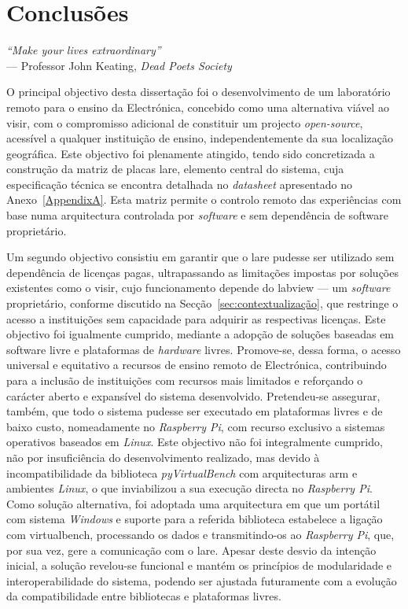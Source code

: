 \chapter{Conclusões}
\label{Capítulo6}
\begin{flushright}
\textit{``Make your lives extraordinary''} \\[0.5em]
--- Professor John Keating, \textit{Dead Poets Society}
\end{flushright}
O principal objectivo desta dissertação foi o desenvolvimento de um \acrshort{laboratório remoto} para o ensino da Electrónica, concebido como uma alternativa viável ao \acrshort{visir}, com o compromisso adicional de constituir um projecto \textit{open-source}, acessível a qualquer instituição de ensino, independentemente da sua localização geográfica. Este objectivo foi plenamente atingido, tendo sido concretizada a construção da matriz de placas \acrshort{lare}, elemento central do sistema, cuja especificação técnica se encontra detalhada no \textit{datasheet} apresentado no Anexo~\ref{AppendixA}. Esta matriz permite o controlo remoto das experiências com base numa arquitectura controlada por \textit{software} e sem dependência de software proprietário.

Um segundo objectivo consistiu em garantir que o \acrshort{lare} pudesse ser utilizado sem dependência de licenças pagas, ultrapassando as limitações impostas por soluções existentes como o \acrshort{visir}, cujo funcionamento depende do \acrshort{labview} — um \textit{software} proprietário, conforme discutido na Secção~\ref{sec:contextualização}, que restringe o acesso a instituições sem capacidade para adquirir as respectivas licenças. Este objectivo foi igualmente cumprido, mediante a adopção de soluções baseadas em software livre e plataformas de \textit{hardware} livres. Promove-se, dessa forma, o acesso universal e equitativo a recursos de ensino remoto de Electrónica, contribuindo para a inclusão de instituições com recursos mais limitados e reforçando o carácter aberto e expansível do sistema desenvolvido. Pretendeu-se assegurar, também, que todo o sistema pudesse ser executado em plataformas livres e de baixo custo, nomeadamente no \textit{Raspberry Pi}, com recurso exclusivo a sistemas operativos baseados em \textit{Linux}. Este objectivo não foi integralmente cumprido, não por insuficiência do desenvolvimento realizado, mas devido à incompatibilidade da biblioteca \textit{pyVirtualBench} com arquitecturas \acrshort{arm} e ambientes \textit{Linux}, o que inviabilizou a sua execução directa no \textit{Raspberry Pi}. Como solução alternativa, foi adoptada uma arquitectura em que um portátil com sistema \textit{Windows} e suporte para a referida biblioteca estabelece a ligação com \acrshort{virtualbench}, processando os dados e transmitindo-os ao \textit{Raspberry Pi}, que, por sua vez, gere a comunicação com o \acrshort{lare}. Apesar deste desvio da intenção inicial, a solução revelou-se funcional e mantém os princípios de modularidade e interoperabilidade do sistema, podendo ser ajustada futuramente com a evolução da compatibilidade entre bibliotecas e plataformas livres.

